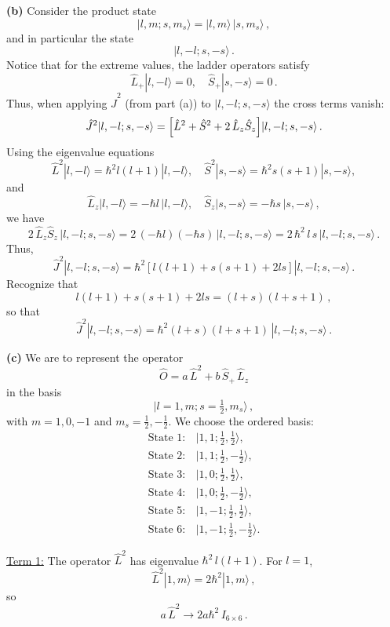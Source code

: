 \documentclass{article}
\begin{document}
\textbf{(b)} Consider the product state
\[
|l, m; s, m_s\rangle = |l, m\rangle\,|s, m_s\rangle\,,
\]
and in particular the state
\[
|l, -l; s, -s\rangle\,.
\]
Notice that for the extreme values, the ladder operators satisfy
\[
\hat{L}_+|l, -l\rangle = 0,\quad \hat{S}_+|s, -s\rangle = 0\,.
\]
Thus, when applying \(\hat{J}^2\) (from part (a)) to \(|l, -l; s, -s\rangle\) the cross terms vanish:
\[
\hat{J}^2 |l, -l; s, -s\rangle = \Bigl[\hat{L}^2 + \hat{S}^2 + 2\,\hat{L}_z\hat{S}_z\Bigr] |l, -l; s, -s\rangle\,.
\]
Using the eigenvalue equations
\[
\hat{L}^2|l,-l\rangle = \hbar^2 l(l+1)|l,-l\rangle,\quad \hat{S}^2|s,-s\rangle = \hbar^2 s(s+1)|s,-s\rangle,
\]
and
\[
\hat{L}_z|l,-l\rangle = -\hbar l\,|l,-l\rangle,\quad \hat{S}_z|s,-s\rangle = -\hbar s\,|s,-s\rangle\,,
\]
we have
\[
2\,\hat{L}_z\hat{S}_z\,|l,-l; s,-s\rangle = 2\,(-\hbar l)(-\hbar s)\,|l,-l; s,-s\rangle = 2\,\hbar^2\,l\,s\,|l,-l; s,-s\rangle\,.
\]
Thus,
\[
\hat{J}^2 |l,-l; s,-s\rangle = \hbar^2\left[l(l+1) + s(s+1) + 2ls\right] |l,-l; s,-s\rangle\,.
\]
Recognize that
\[
l(l+1) + s(s+1) + 2ls = (l+s)(l+s+1)\,,
\]
so that
\[
\boxed{\hat{J}^2 |l,-l; s,-s\rangle = \hbar^2 (l+s)(l+s+1)\,|l,-l; s,-s\rangle}\,.
\]

\textbf{(c)} We are to represent the operator
\[
\hat{O} = a\,\hat{L}^2 + b\,\hat{S}_+\,\hat{L}_z
\]
in the basis
\[
|l=1, m; s=\tfrac{1}{2}, m_s\rangle\,,
\]
with \(m = 1, 0, -1\) and \(m_s = \tfrac{1}{2}, -\tfrac{1}{2}\). We choose the ordered basis:
\[
\begin{array}{cl}
\text{State }1: & |1,1; \tfrac{1}{2}, \tfrac{1}{2}\rangle,\\[1mm]
\text{State }2: & |1,1; \tfrac{1}{2}, -\tfrac{1}{2}\rangle,\\[1mm]
\text{State }3: & |1,0; \tfrac{1}{2}, \tfrac{1}{2}\rangle,\\[1mm]
\text{State }4: & |1,0; \tfrac{1}{2}, -\tfrac{1}{2}\rangle,\\[1mm]
\text{State }5: & |1,-1; \tfrac{1}{2}, \tfrac{1}{2}\rangle,\\[1mm]
\text{State }6: & |1,-1; \tfrac{1}{2}, -\tfrac{1}{2}\rangle.
\end{array}
\]

\underline{Term 1:} The operator \(\hat{L}^2\) has eigenvalue \(\hbar^2\,l(l+1)\). For \(l=1\),
\[
\hat{L}^2 |1,m\rangle = 2\hbar^2 |1,m\rangle\,,
\]
so
\[
a\,\hat{L}^2 \rightarrow 2a\hbar^2\,I_{6\times 6}\,.
\]
\end{document}
